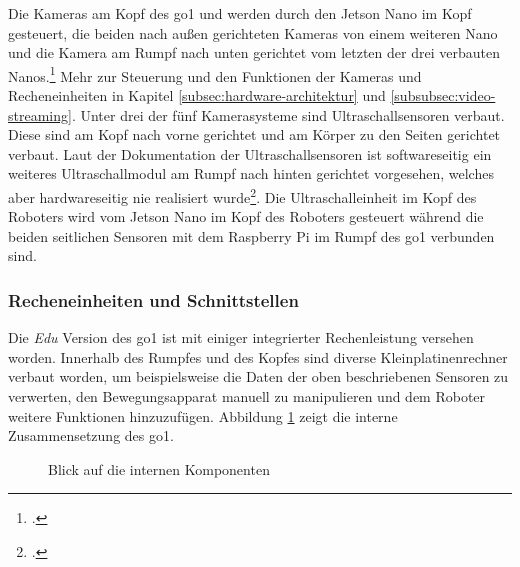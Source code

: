 Die Kameras am Kopf des \gls{go1}  und  werden durch den Jetson Nano im Kopf gesteuert, die beiden
nach außen gerichteten Kameras  von einem weiteren Nano und die Kamera am Rumpf nach unten gerichtet 
vom letzten der drei verbauten Nanos.\footcite{go1_kamera_anleitung}
Mehr zur Steuerung und den Funktionen der Kameras und Recheneinheiten in Kapitel \ref{subsec:hardware-architektur} und
\ref{subsubsec:video-streaming}.
Unter drei der fünf Kamerasysteme sind Ultraschallsensoren verbaut.
Diese sind am Kopf nach vorne gerichtet  und am Körper zu den Seiten gerichtet  verbaut.
Laut der Dokumentation der Ultraschallsensoren ist softwareseitig ein weiteres Ultraschallmodul am Rumpf nach hinten
gerichtet  vorgesehen, welches aber hardwareseitig nie realisiert wurde\footcite{go1_ultraschall_anleitung}.
Die Ultraschalleinheit im Kopf des Roboters wird vom Jetson Nano im Kopf des Roboters gesteuert während die beiden seitlichen
Sensoren mit dem Raspberry Pi im Rumpf des \gls{go1} verbunden sind.


\subsubsection{Recheneinheiten und Schnittstellen}
\label{subsubsec:recheneinheiten}

Die \emph{Edu} Version des \gls{go1} ist mit einiger integrierter Rechenleistung versehen worden.
Innerhalb des Rumpfes und des Kopfes sind diverse Kleinplatinenrechner verbaut worden, um beispielsweise die Daten der oben beschriebenen
Sensoren zu verwerten, den Bewegungsapparat manuell zu manipulieren und dem Roboter weitere Funktionen hinzuzufügen.
Abbildung \ref{fig:intern} zeigt die interne Zusammensetzung des \gls{go1}.

\begin{figure}[h]
    \caption{Blick auf die internen Komponenten}\label{fig:intern}
\end{figure}

